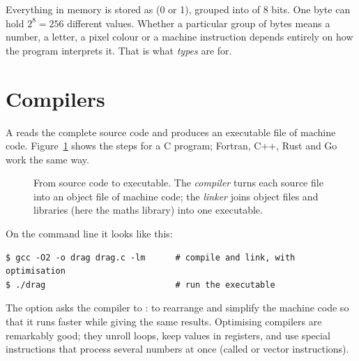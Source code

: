 Everything in memory is stored as  (0 or 1), grouped into  of 8
bits. One byte can hold $2^8 = 256$ different values. Whether a particular group of bytes
means a number, a letter, a pixel colour or a machine instruction depends entirely on how
the program interprets it. That is what \emph{types} are for.

\section{Compilers}

A  reads the complete source code and produces an executable file of
machine code. Figure~\ref{fig:compile} shows the steps for a C program; Fortran, C++,
Rust and Go work the same way.

\begin{figure}[htbp]
\centering
{}
\caption{From source code to executable. The \emph{compiler} turns each source file into
an object file of machine code; the \emph{linker} joins object files and libraries (here
the maths library) into one executable.}
\label{fig:compile}
\end{figure}

On the command line it looks like this:
\begin{lstlisting}[style=shell]
$ gcc -O2 -o drag drag.c -lm      # compile and link, with optimisation
$ ./drag                          # run the executable
\end{lstlisting}
The option  asks the compiler to : to rearrange and simplify the
machine code so that it runs faster while giving the same results. Optimising compilers
are remarkably good; they unroll loops, keep values in registers, and use special
instructions that process several numbers at once (called  or vector
instructions).

